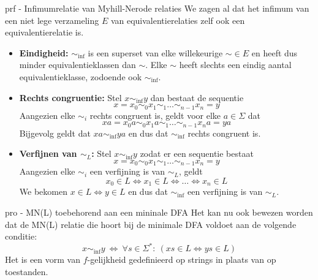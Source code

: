 \begin{prf}{prf - Infimumrelatie van Myhill-Nerode relaties}
    We zagen al dat het infimum van een niet lege verzameling $E$ van equivalentierelaties zelf ook een equivalentierelatie is.

    \begin{itemize}
        \item 
            \textbf{Eindigheid:} $\sim_{\text{inf}}$ is een superset van elke willekeurige $\sim \in E$ en heeft dus minder equivalentieklassen
            dan $\sim$. Elke $\sim$ heeft slechts een eindig aantal equivalentieklasse, zodoende ook $\sim_{\text{inf}}$.
        \item 
            \textbf{Rechts congruentie:} Stel $x \sim_{\text{inf}} y$ dan bestaat de sequentie 
            \begin{equation*}
                x = x_0 \sim_0 x_1 \sim_1 \ldots \sim_{n-1} x_n = y
            \end{equation*}
            Aangezien elke $\sim_i$ rechts congruent is, geldt voor elke $a \in \Sigma$ dat 
            \begin{equation*}
                xa = x_0a \sim_0 x_1a \sim_1 \ldots \sim_{n-1} x_na = ya
            \end{equation*}
            Bijgevolg geldt dat $xa \sim_{\text{inf}} ya$ en dus dat $\sim_{\text{inf}}$ rechts congruent is.
        \item 
            \textbf{Verfijnen van $\sim_L$:} Stel $x \sim_{\text{inf}} y$ zodat er een sequentie bestaat 
            \begin{equation*}
                x = x_0 \sim_0 x_1 \sim_1 \ldots \sim_{n-1} x_n = y
            \end{equation*}
            Aangezien elke $\sim_i$ een verfijning is van $\sim_L$, geldt
            \begin{equation*}
                x_0 \in L \Leftrightarrow x_1 \in L \Leftrightarrow \ldots \Leftrightarrow x_n \in L
            \end{equation*}
            We bekomen $x \in L \Leftrightarrow y \in L$ en dus dat $\sim_{\text{inf}}$ een verfijning is van $\sim_L$.
    \end{itemize}
\end{prf}

\begin{pro}{pro - MN(L) toebehorend aan een mininale DFA}
    Het kan nu ook bewezen worden dat de MN(L) relatie die hoort bij de minimale DFA voldoet aan de volgende conditie:
    \begin{equation*}
        x \sim_{\text{inf}} y \ \Leftrightarrow \  \forall s \in \Sigma^*: \ ( xs \in L \Leftrightarrow ys \in L )
    \end{equation*}
    Het is een vorm van $f$-gelijkheid gedefinieerd op strings in plaats van op toestanden.
\end{pro}

